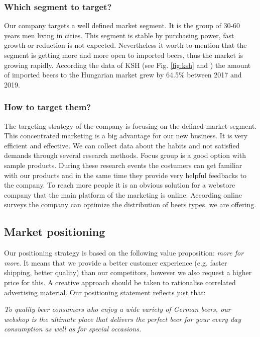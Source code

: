 \subsubsection*{Which segment to target?}

Our company targets a well defined market segment. It is the group of 30-60 years men living in cities. This segment is stable by purchasing power, fast growth or reduction is not expected. Nevertheless it worth to mention that the segment is getting more and more open to imported beers, thus the market is growing rapidly. According the data of KSH (see Fig. \ref{fig:ksh} and \cite{ksh2}) the amount of imported beers to the Hungarian market grew by 64.5\% between 2017 and 2019.


\subsubsection*{How to target them?}

The targeting strategy of the company is focusing on the defined market segment. This concentrated marketing is a big advantage for our new business. It is very efficient and effective. We can collect data about the habits and not satisfied demands through several research methods.
Focus group is a good option with sample products. During these research events the costumers can get familiar with our products and in the same time they provide very helpful feedbacks to the company. To reach more people it is an obvious solution for a webstore company that the main platform of the marketing is online. According online surveys the company can optimize the distribution of beers types, we are offering.


\subsection{Market positioning}


Our positioning strategy is based on the following value proposition:  \textit{more for more}. It means that we provide a better customer experience (e.g. faster shipping, better quality) than our competitors, however we also request a higher price for this. A creative approach should be taken to rationalise correlated advertising material. Our positioning statement reflects just that:

\textit{To quality beer consumers who enjoy a wide variety of German beers, our webshop is the ultimate place that delivers the perfect beer for your every day consumption as well as for special occasions.}



